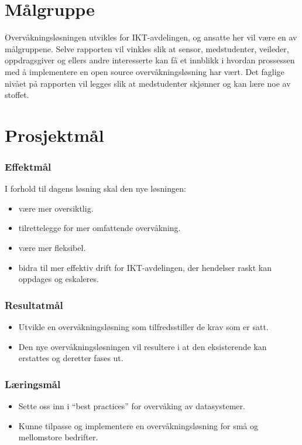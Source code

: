 \section{Målgruppe}
Overvåkningsløsningen utvikles for IKT-avdelingen, og ansatte her vil være en av målgruppene. Selve rapporten vil vinkles slik at sensor, medstudenter, veileder, oppdragsgiver og ellers andre interesserte kan få et innblikk i hvordan prossessen med å implementere en open source overvåkningsløsning har vært. Det faglige nivået på rapporten vil legges slik at medstudenter skjønner og kan lære noe av stoffet.

\section{Prosjektmål}
\subsubsection{Effektmål}
I forhold til dagens løsning skal den nye løsningen:
\begin{itemize}
	\item være mer oversiktlig.
	\item tilrettelegge for mer omfattende overvåkning.
	\item være mer fleksibel.
	\item bidra til mer effektiv drift for IKT-avdelingen, der hendelser raskt kan oppdages og eskaleres.
\end{itemize}

\subsubsection{Resultatmål}
\begin{itemize}
	\item Utvikle en overvåkningsløsning som tilfredsstiller de krav som er satt.
	\item Den nye overvåkningsløsningen vil resultere i at den eksisterende kan erstattes og deretter fases ut.
\end{itemize}

\subsubsection{Læringsmål}
\begin{itemize}
	\item Sette oss inn i “best practices” for overvåking av datasystemer.
	\item Kunne tilpasse og implementere en overvåkningsløsning for små og mellomstore bedrifter.
\end{itemize}

